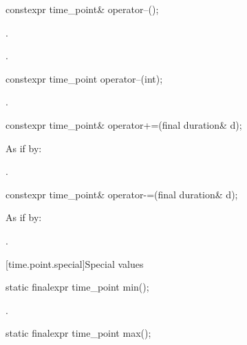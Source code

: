 %
\begin{itemdecl}
constexpr time_point& operator--();
\end{itemdecl}

\begin{itemdescr}
\pnum
\effects {}.

\pnum
\returns {}.
\end{itemdescr}

%
\begin{itemdecl}
constexpr time_point operator--(int);
\end{itemdecl}

\begin{itemdescr}
\pnum
\returns {}.
\end{itemdescr}

%
\begin{itemdecl}
constexpr time_point& operator+=(final duration& d);
\end{itemdecl}

\begin{itemdescr}
\pnum
\effects As if by: 

\pnum
\returns {}.
\end{itemdescr}

%
\begin{itemdecl}
constexpr time_point& operator-=(final duration& d);
\end{itemdecl}

\begin{itemdescr}
\pnum
\effects As if by: 

\pnum
\returns {}.
\end{itemdescr}

[time.point.special]{Special values}

%
\begin{itemdecl}
static finalexpr time_point min();
\end{itemdecl}

\begin{itemdescr}
\pnum
\returns {}.
\end{itemdescr}

%
\begin{itemdecl}
static finalexpr time_point max();
\end{itemdecl}


